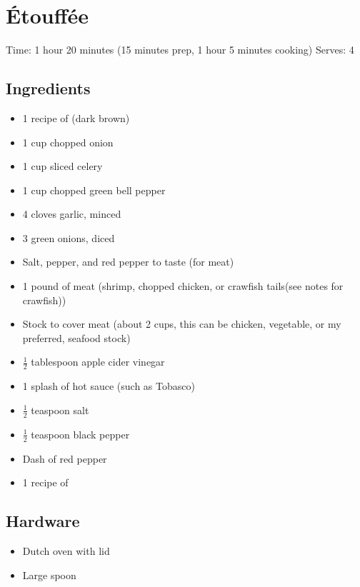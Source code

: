 \section{Étouffée}
\label{etouffee}
\setcounter{secnumdepth}{0}
Time: 1 hour 20 minutes (15 minutes prep, 1 hour 5 minutes cooking)
Serves: 4

\begin{multicols}{2}
\subsection*{Ingredients}
\begin{itemize}
    \item 1 recipe of  (dark brown)
    \item 1 cup chopped onion
    \item 1 cup sliced celery
    \item 1 cup chopped green bell pepper
    \item 4 cloves garlic, minced
    \item 3 green onions, diced
    \item Salt, pepper, and red pepper to taste (for meat)
    \item 1 pound of meat (shrimp, chopped chicken, or crawfish tails(see notes for crawfish))
    \item Stock to cover meat (about 2 cups, this can be chicken, vegetable, or my preferred, seafood stock)
    \item \( \frac{1}{2} \) tablespoon apple cider vinegar
    \item 1 splash of hot sauce (such as Tobasco)
    \item \( \frac{1}{2} \) teaspoon salt
    \item \( \frac{1}{2} \) teaspoon black pepper
    \item Dash of red pepper
    \item 1 recipe of 
\end{itemize}

\subsection*{Hardware}
\begin{itemize}
    \item Dutch oven with lid
    \item Large spoon
\end{itemize}
\clearpage


\end{multicols}
